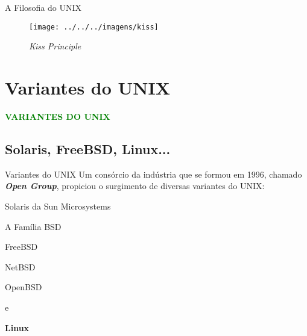 \documentclass{beamer}
\begin{document}
   \begin{frame}{A Filosofia do UNIX}
      \centering
      \begin{figure}
	\texttt{[image: ../../../imagens/kiss]}
	\caption{\textit{Kiss Principle} \cite{SW2010}} 
      \end{figure}
   \end{frame}

\section{Variantes do UNIX}
  \begin{frame}
     \begin{center}
        \Large{\textcolor{green}{\textbf{VARIANTES DO UNIX}}}
     \end{center}
   \end{frame}
  \subsection{Solaris, FreeBSD, Linux...}
   \begin{frame}[t]{Variantes do UNIX}
      Um consórcio da indústria que se formou em 1996, chamado \textbf{\textit{Open Group}}, propiciou o surgimento de diversas variantes do UNIX:
      \begin{itemize}
	\vspace{\baselineskip}
        {\item Solaris da Sun Microsystems}
	{\item A Família BSD}
	\begin{itemize}
	  {\item FreeBSD}
	  {\item NetBSD}
	  {\item OpenBSD}
	\end{itemize}
      {\item \alert{e}}
      {\item \textbf{Linux}}
      \end{itemize}
   \end{frame}
\end{document}
